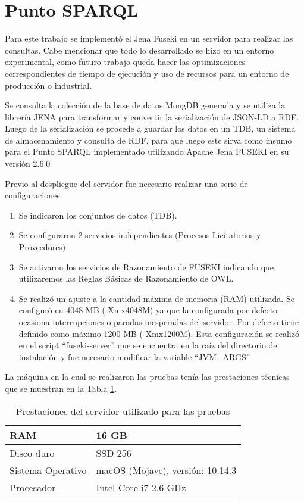 \section{Punto SPARQL}
\label{section:puntosparql}

Para este trabajo se implementó el Jena Fuseki\cite{ApacheJe97:online} en un servidor para realizar las consultas. Cabe mencionar que todo lo desarrollado se hizo en un entorno experimental, como futuro trabajo queda hacer las optimizaciones correspondientes de tiempo de ejecución y uso de recursos para un entorno de producción o industrial.

Se consulta la colección de la base de datos MongDB generada y se utiliza la librería JENA para transformar y convertir la serialización de JSON-LD a RDF. Luego de la serialización se procede a guardar los datos en un TDB, un sistema de almacenamiento y consulta de RDF, para que luego este sirva como insumo para el Punto SPARQL implementado utilizando Apache Jena FUSEKI en su versión 2.6.0

Previo al despliegue del servidor fue necesario realizar una serie de configuraciones.

\begin{enumerate}
    \item Se indicaron los conjuntos de datos (TDB).
    \item Se configuraron 2 servicios independientes (Procesos Licitatorios y Proveedores)
    \item Se activaron los servicios de Razonamiento de FUSEKI indicando que utilizaremos las Reglas Básicas de Razonamiento de OWL. 
    \item Se realizó un ajuste a la cantidad máxima de memoria (RAM) utilizada. Se configuró en 4048 MB (-Xmx4048M) ya que la configurada por defecto ocasiona interrupciones o paradas inesperadas del servidor. Por defecto tiene definido como máximo 1200 MB (-Xmx1200M). Esta configuración se realizó en el script “fuseki-server” que se encuentra en la raíz del directorio de instalación y fue necesario modificar la variable “JVM\_ARGS” 

\end{enumerate}

La máquina en la cual se realizaron las pruebas tenía las prestaciones técnicas que se muestran en la Tabla \ref{tab:prestaciones_servidor}.


\begin{table}[!htb]
\centering
    \caption{Prestaciones del servidor utilizado para las pruebas}
    \label{tab:prestaciones_servidor}
\begin{tabular}{|l|l|}
\hline
 RAM & 16 GB\\\hline
    Disco duro & SSD 256\\\hline
    Sistema Operativo & macOS (Mojave), versión: 10.14.3\\\hline
    Procesador & Intel Core i7 2.6 GHz\\\hline
\end{tabular}
\end{table}


